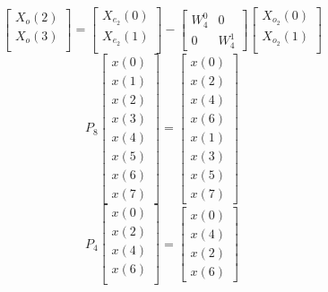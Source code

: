\documentclass[journal,12pt,twocolumn]{IEEEtran}
\begin{document}
\begin{equation}
\begin{bmatrix}
X_{o}(2) \\ 
X_{o}(3)\\ 
\end{bmatrix}
=
\begin{bmatrix}
X_{e_{2}}(0) \\ 
X_{e_{2}}(1)\\ 
\end{bmatrix}
-
\begin{bmatrix}
W^{0}_{4} & 0\\
0 & W^{1}_{4}
\end{bmatrix}
\begin{bmatrix}
X_{o_{2}}(0) \\ 
X_{o_{2}}(1) \\ 
\end{bmatrix}
\end{equation}
\begin{equation}
P_{8}
\begin{bmatrix}
x(0) \\ 
x(1) \\ 
x(2) \\ 
x(3) \\ 
x(4) \\ 
x(5) \\
x(6) \\
x(7)
\end{bmatrix}
 = 
\begin{bmatrix}
x(0) \\ 
x(2) \\ 
x(4) \\ 
x(6) \\
x(1) \\ 
x(3) \\ 
x(5) \\
x(7)
\end{bmatrix}
\end{equation}
\begin{equation}
P_{4}
\begin{bmatrix}
x(0) \\ 
x(2) \\ 
x(4) \\ 
x(6) \\
\end{bmatrix}
 = 
\begin{bmatrix}
x(0) \\ 
x(4) \\ 
x(2) \\
x(6)
\end{bmatrix}
\end{equation}
\end{document}
